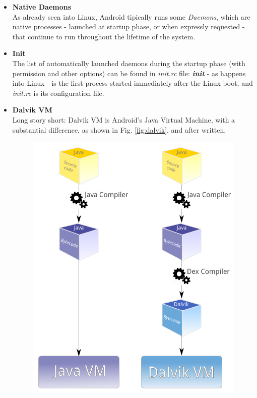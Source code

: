 \begin{itemize}
\item \textbf{Native Daemons}\\
As already seen into Linux, Android tipically runs some \textit{Daemons}, which are native processes - launched at startup phase, or when expressly requested - that continue to run throughout the lifetime of the system.
\item \textbf{Init}\\
The list of automatically launched daemons during the startup phase (with permission and other options) can be found in \textit{init.rc} file: \textit{\textbf{init}} - as happens into Linux - is the first process started immediately after the Linux boot, and \textit{init.rc} is its configuration file.
\item \textbf{Dalvik VM}\\
Long story short: Dalvik VM is Android's Java Virtual Machine, with a substantial difference, as shown in Fig. \ref{fig:dalvik}, and after written.\\
\begin{figure}[!htb]
	\centering
	\includegraphics[scale=.8]{images/dalvik.pdf}

\end{figure}
\end{itemize}
